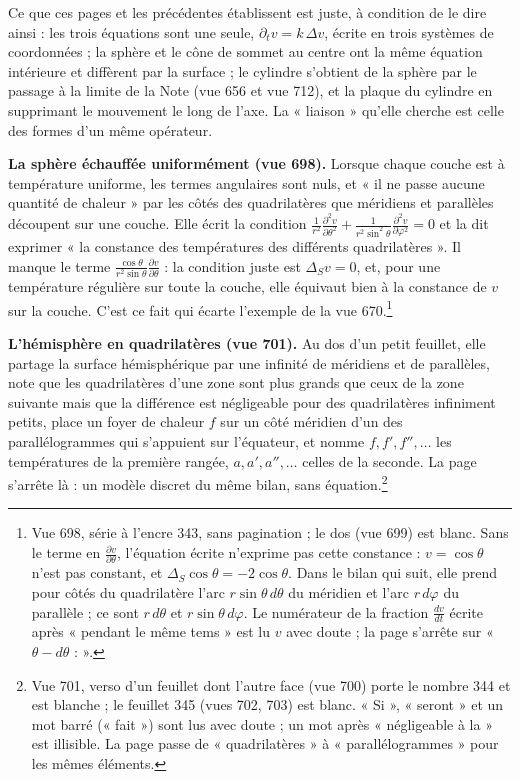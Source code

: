 \documentclass[11pt,a4paper]{article}
\begin{document}
Ce que ces pages et les précédentes établissent est juste, à condition de le
dire ainsi : les trois équations sont une seule, $\partial_t v = k\,\Delta v$,
écrite en trois systèmes de coordonnées ; la sphère et le cône de sommet au
centre ont la même équation intérieure et diffèrent par la surface ; le
cylindre s'obtient de la sphère par le passage à la limite de la Note (vue 656
et vue 712), et la plaque du cylindre en supprimant le mouvement le long de
l'axe. La « liaison » qu'elle cherche est celle des formes d'un même opérateur.

\textbf{La sphère échauffée uniformément (vue 698).} Lorsque chaque couche est
à température uniforme, les termes angulaires sont nuls, et « il ne passe
aucune quantité de chaleur » par les côtés des quadrilatères que méridiens et
parallèles découpent sur une couche. Elle écrit la condition
$\frac{1}{r^2}\frac{\partial^2 v}{\partial\theta^2} + \frac{1}{r^2\sin^2\theta}
\frac{\partial^2 v}{\partial\varphi^2} = 0$ et la dit exprimer « la constance
des températures des différents quadrilatères ». Il manque le terme
$\frac{\cos\theta}{r^2\sin\theta}\frac{\partial v}{\partial\theta}$ : la
condition juste est $\Delta_S v = 0$, et, pour une température régulière sur
toute la couche, elle équivaut bien à la constance de $v$ sur la couche. C'est
ce fait qui écarte l'exemple de la vue 670.\footnote{Vue 698, série à l'encre
343, sans pagination ; le dos (vue 699) est blanc. Sans le terme en
$\frac{\partial v}{\partial\theta}$, l'équation écrite n'exprime pas cette
constance : $v = \cos\theta$ n'est pas constant, et $\Delta_S\cos\theta =
-2\cos\theta$. Dans le bilan qui suit, elle prend pour côtés du quadrilatère
l'arc $r\sin\theta\,d\theta$ du méridien et l'arc $r\,d\varphi$ du parallèle ;
ce sont $r\,d\theta$ et $r\sin\theta\,d\varphi$. Le numérateur de la fraction
$\frac{dv}{dt}$ écrite après « pendant le même tems » est lu $v$ avec doute ;
la page s'arrête sur « $\theta - d\theta$ : ».}

\textbf{L'hémisphère en quadrilatères (vue 701).} Au dos d'un petit feuillet,
elle partage la surface hémisphérique par une infinité de méridiens et de
parallèles, note que les quadrilatères d'une zone sont plus grands que ceux de
la zone suivante mais que la différence est négligeable pour des quadrilatères
infiniment petits, place un foyer de chaleur $f$ sur un côté méridien d'un des
parallélogrammes qui s'appuient sur l'équateur, et nomme $f, f', f'', \dots$ les
températures de la première rangée, $a, a', a'', \dots$ celles de la seconde.
La page s'arrête là : un modèle discret du même bilan, sans
équation.\footnote{Vue 701, verso d'un feuillet dont l'autre face (vue 700)
porte le nombre 344 et est blanche ; le feuillet 345 (vues 702, 703) est blanc.
« Si », « seront » et un mot barré (« fait ») sont lus avec doute ; un mot après
« négligeable à la » est illisible. La page passe de « quadrilatères » à
« parallélogrammes » pour les mêmes éléments.}
\end{document}
